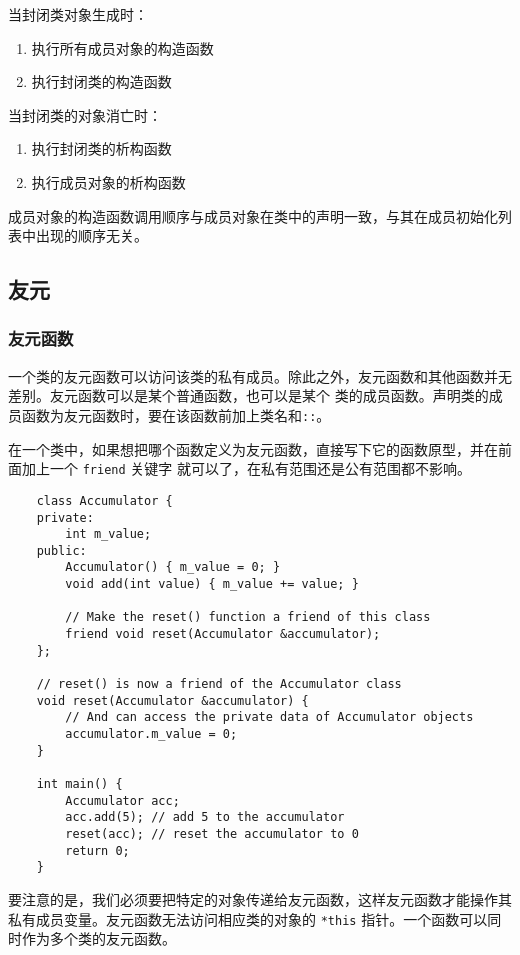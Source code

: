 \documentclass[UTF8]{ctexart}
\begin{document}
当封闭类对象生成时：
\begin{enumerate}
    \item 执行所有成员对象的构造函数
    \item 执行封闭类的构造函数
\end{enumerate}

当封闭类的对象消亡时：
\begin{enumerate}
    \item 执行封闭类的析构函数
    \item 执行成员对象的析构函数
\end{enumerate}

成员对象的构造函数调用顺序与成员对象在类中的声明一致，与其在成员初始化列表中出现的顺序无关。

\subsection{友元}
\subsubsection{友元函数}
一个类的友元函数可以访问该类的私有成员。除此之外，友元函数和其他函数并无差别。友元函数可以是某个普通函数，也可以是某个
类的成员函数。声明类的成员函数为友元函数时，要在该函数前加上类名和\texttt{::}。

在一个类中，如果想把哪个函数定义为友元函数，直接写下它的函数原型，并在前面加上一个 \texttt{friend} 关键字
就可以了，在私有范围还是公有范围都不影响。
\begin{verbatim}
    class Accumulator {
    private:
        int m_value;
    public:
        Accumulator() { m_value = 0; }
        void add(int value) { m_value += value; }

        // Make the reset() function a friend of this class
        friend void reset(Accumulator &accumulator);
    };

    // reset() is now a friend of the Accumulator class
    void reset(Accumulator &accumulator) {
        // And can access the private data of Accumulator objects
        accumulator.m_value = 0;
    }

    int main() {
        Accumulator acc;
        acc.add(5); // add 5 to the accumulator
        reset(acc); // reset the accumulator to 0
        return 0;
    }
\end{verbatim}

要注意的是，我们必须要把特定的对象传递给友元函数，这样友元函数才能操作其私有成员变量。友元函数无法访问相应类的对象的
\texttt{*this} 指针。一个函数可以同时作为多个类的友元函数。
\end{document}
